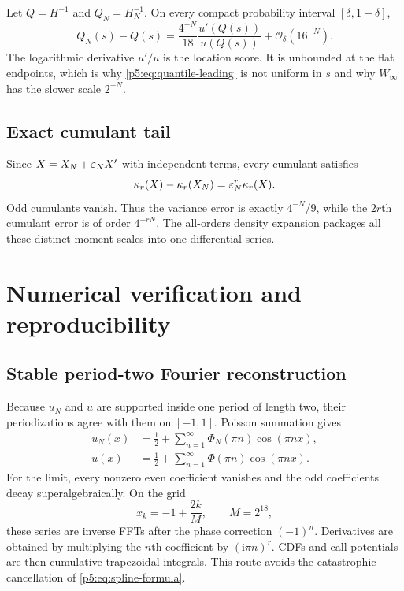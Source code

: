 \documentclass[11pt,oneside]{article}
\numberwithin{equation}{section}
\theoremstyle{definition}
\theoremstyle{remark}
\newcommand{\ii}{\mathrm i}
\newcommand{\bigO}{\mathcal O}
\begin{document}
Let $Q=H^{-1}$ and $Q_N=H_N^{-1}$.  On every compact probability interval $[\delta,1-\delta]$,
\begin{equation}
 Q_N(s)-Q(s)
 =\frac{4^{-N}}{18}
 \frac{u'(Q(s))}{u(Q(s))}
 +\bigO_{\delta}(16^{-N}).
 \label{p5:eq:quantile-leading}
\end{equation}
The logarithmic derivative $u'/u$ is the location score.  It is unbounded at the flat endpoints, which is why \eqref{p5:eq:quantile-leading} is not uniform in $s$ and why $W_\infty$ has the slower scale $2^{-N}$.

\subsection{Exact cumulant tail}

Since $X=X_N+\varepsilon_NX'$ with independent terms, every cumulant satisfies
\begin{equation}
 \kappa_r(X)-\kappa_r(X_N)=\varepsilon_N^r\kappa_r(X).
 \label{p5:eq:cumulant-tail}
\end{equation}
Odd cumulants vanish.  Thus the variance error is exactly $4^{-N}/9$, while the $2r$th cumulant error is of order $4^{-rN}$.  The all-orders density expansion packages all these distinct moment scales into one differential series.

\section{Numerical verification and reproducibility}
\label{p5:sec:numerics}

\subsection{Stable period-two Fourier reconstruction}

Because $u_N$ and $u$ are supported inside one period of length two, their periodizations agree with them on $[-1,1]$.  Poisson summation gives
\begin{align}
 u_N(x)&=\frac12+\sum_{n=1}^{\infty}\Phi_N(\pi n)\cos(\pi nx),
 \label{p5:eq:cosine-N}\\
 u(x)&=\frac12+\sum_{n=1}^{\infty}\Phi(\pi n)\cos(\pi nx).
 \label{p5:eq:cosine-limit}
\end{align}
For the limit, every nonzero even coefficient vanishes and the odd coefficients decay superalgebraically.  On the grid
\[
 x_k=-1+\frac{2k}{M},\qquad M=2^{18},
\]
these series are inverse FFTs after the phase correction $(-1)^n$.  Derivatives are obtained by multiplying the $n$th coefficient by $(\ii\pi n)^r$.  CDFs and call potentials are then cumulative trapezoidal integrals.  This route avoids the catastrophic cancellation of \eqref{p5:eq:spline-formula}.
\end{document}
